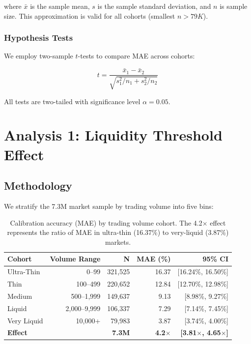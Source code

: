 \documentclass[a4paper,11pt]{article}
\theoremstyle{plain}
\theoremstyle{definition}
\theoremstyle{remark}
\begin{document}
where $\bar{x}$ is the sample mean, $s$ is the sample standard deviation, and $n$ is sample size. This approximation is valid for all cohorts (smallest $n > 79K$).

\subsubsection{Hypothesis Tests}

We employ two-sample $t$-tests to compare MAE across cohorts:

\begin{equation}
t = \frac{\bar{x}_1 - \bar{x}_2}{\sqrt{s_1^2/n_1 + s_2^2/n_2}}
\label{eq:ttest}
\end{equation}

All tests are two-tailed with significance level $\alpha = 0.05$.


\section{Analysis 1: Liquidity Threshold Effect}
\label{sec:analysis1}

\subsection{Methodology}

We stratify the 7.3M market sample by trading volume into five bins:

\begin{table}[h]
\centering
\begin{tabular}{lrrrr}
\toprule
\textbf{Cohort} & \textbf{Volume Range} & \textbf{N} & \textbf{MAE (\%)} & \textbf{95\% CI} \\
\midrule
Ultra-Thin & 0--99 & 321,525 & 16.37 & [16.24\%, 16.50\%] \\
Thin & 100--499 & 220,652 & 12.84 & [12.70\%, 12.98\%] \\
Medium & 500--1,999 & 149,637 & 9.13 & [8.98\%, 9.27\%] \\
Liquid & 2,000--9,999 & 106,337 & 7.29 & [7.14\%, 7.45\%] \\
Very Liquid & 10,000+ & 79,983 & 3.87 & [3.74\%, 4.00\%] \\
\midrule
\textbf{Effect} & & \textbf{7.3M} & \textbf{4.2$\times$} & \textbf{[3.81$\times$, 4.65$\times$]} \\
\bottomrule
\end{tabular}
\caption{Calibration accuracy (MAE) by trading volume cohort. The 4.2$\times$ effect represents the ratio of MAE in ultra-thin (16.37\%) to very-liquid (3.87\%) markets.}
\label{tab:volume_cohorts}
\end{table}
\end{document}
